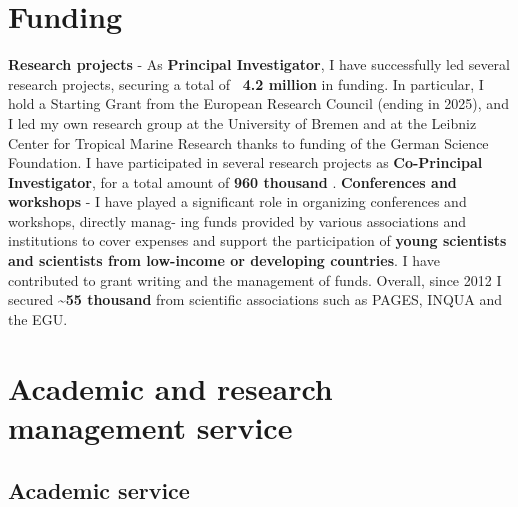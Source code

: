 \documentclass[%
               doublesided,
               paper=a4,
               fontsize=10pt
              ]{my-resume}
\begin{document}
\section[\faEuro]{Funding}
\textbf{Research projects} -  As \textbf{Principal Investigator}, I have successfully led several research projects, securing a total of \textbf{~4.2 million \texteuro} in funding. In particular, I hold a Starting Grant from the European Research Council (ending in 2025), and I led my own research group at the University of Bremen and at the Leibniz Center for Tropical Marine Research thanks to funding of the German Science Foundation. I have participated in several research projects as \textbf{Co-Principal Investigator}, for a total amount of \textbf{960 thousand \texteuro}.
\bigskip
\textbf{Conferences and workshops} - I have played a significant role in organizing conferences and workshops, directly manag- ing funds provided by various associations and institutions to cover expenses and support the participation of \textbf{young scientists and scientists from low-income or developing countries}. I have contributed to grant writing and the management of funds. Overall, since 2012 I secured \textbf{\textasciitilde55 thousand \texteuro} from scientific associations such as PAGES, INQUA and the EGU.

\section[\faInstitution]{Academic and research management service}
\subsection{Academic service}
\end{document}
